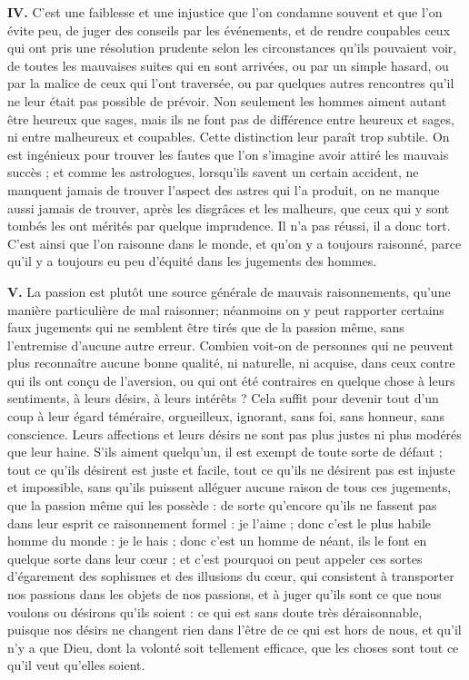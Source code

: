 \bigbreak
{\bfseries\scshape IV.} C'est une faiblesse et une injustice que l'on condamne souvent et que l'on évite peu, de juger des conseils par les événements, et de rendre coupables ceux qui ont pris une résolution prudente selon les circonstances qu'ils pouvaient voir, de toutes les mauvaises suites qui en sont arrivées, ou par un simple hasard, ou par la malice de ceux qui l'ont traversée, ou par quelques autres rencontres qu'il ne leur était pas possible de prévoir. Non seulement les hommes aiment autant être heureux que sages, mais ils ne font pas de différence entre heureux et sages, ni entre malheureux et coupables. Cette distinction leur paraît trop subtile. On est ingénieux pour trouver les fautes que l'on s'imagine avoir attiré les mauvais succès ; et comme les astrologues, lorsqu'ils savent un certain accident, ne manquent jamais de trouver l'aspect des astres qui l'a produit, on ne manque aussi jamais de trouver, après les disgrâces et les malheurs, que ceux qui y sont tombés les ont mérités par quelque imprudence. Il n'a pas réussi, il a donc tort. C'est ainsi que l'on raisonne dans le monde, et qu'on y a toujours raisonné, parce qu'il y a toujours eu peu d'équité dans les jugements des hommes.

\bigbreak
{\bfseries\scshape V.} La passion est plutôt une source générale de mauvais raisonnements, qu'une manière particulière de mal raisonner; néanmoins on y peut rapporter certains faux jugements qui ne semblent être tirés que de la passion même, sans l'entremise d'aucune autre erreur. Combien voit-on de personnes qui ne peuvent plus reconnaître aucune bonne qualité, ni naturelle, ni acquise, dans ceux contre qui ils ont conçu de l'aversion, ou qui ont été contraires en quelque chose à leurs sentiments, à leurs désirs, à leurs intérêts ? Cela suffit pour devenir tout d'un coup à leur égard téméraire, orgueilleux, ignorant, sans foi, sans honneur, sans conscience. Leurs affections et leurs désirs ne sont pas plus justes ni plus modérés que leur haine. S'ils aiment quelqu'un, il est exempt de toute sorte de défaut ; tout ce qu'ils désirent est juste et facile, tout ce qu'ils ne désirent pas est injuste et impossible, sans qu'ils puissent alléguer aucune raison de tous ces jugements, que la passion même qui les possède : de sorte qu'encore qu'ils ne fassent pas dans leur esprit ce raisonnement formel : je l'aime ; donc c'est le plus habile homme du monde : je le hais ; donc c'est un homme de néant, ils le font en quelque sorte dans leur cœur ; et c'est pourquoi on peut appeler ces sortes d'égarement des sophismes et des illusions du cœur, qui consistent à transporter nos passions dans les objets de nos passions, et à juger qu'ils sont ce que nous voulons ou désirons qu'ils soient : ce qui est sans doute très déraisonnable, puisque nos désirs ne changent rien dans l'être de ce qui est hors de nous, et qu'il n'y a que Dieu, dont la volonté soit tellement efficace, que les choses sont tout ce qu'il veut qu'elles soient.

